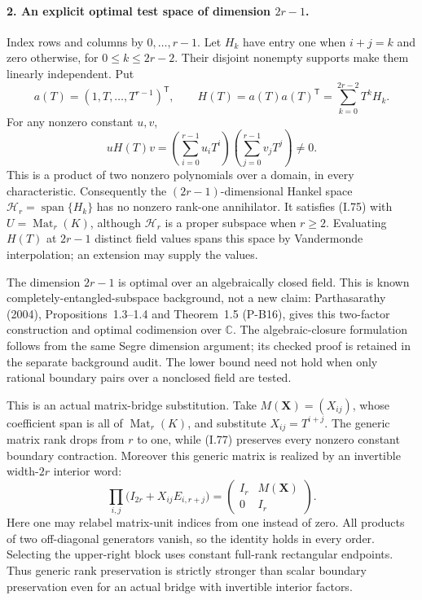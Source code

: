 \paragraph{2. An explicit optimal test space of dimension $2r-1$.}
Index rows and columns by $0,\ldots,r-1$. Let $H_k$ have entry one
when $i+j=k$ and zero otherwise, for $0\le k\le2r-2$. Their disjoint
nonempty supports make them linearly independent. Put
\[
 a(T)=(1,T,\ldots,T^{r-1})^{\mathsf T},\qquad
 H(T)=a(T)a(T)^{\mathsf T}=\sum_{k=0}^{2r-2}T^kH_k.
 \tag{I.76}
\]
For any nonzero constant $u,v$,
\[
 uH(T)v=
   \left(\sum_{i=0}^{r-1}u_iT^i\right)
   \left(\sum_{j=0}^{r-1}v_jT^j\right)\ne0.
 \tag{I.77}
\]
This is a product of two nonzero polynomials over a domain, in every
characteristic. Consequently the $(2r-1)$-dimensional Hankel space
$\mathcal H_r=\operatorname{span}\{H_k\}$ has no nonzero rank-one
annihilator. It satisfies (I.75) with $U=\operatorname{Mat}_r(K)$,
although $\mathcal H_r$ is a proper subspace when $r\ge2$.
Evaluating $H(T)$ at $2r-1$ distinct field values spans this space by
Vandermonde interpolation; an extension may supply the values.

The dimension $2r-1$ is optimal over an algebraically closed field.
This is known completely-entangled-subspace background, not a new
claim: Parthasarathy (2004), Propositions~1.3--1.4 and Theorem~1.5
(P-B16), gives this two-factor construction and optimal codimension
over $\mathbb C$. The algebraic-closure formulation follows from
the same Segre dimension argument; its checked proof is retained
in the separate background audit. The lower bound need not hold
when only rational boundary pairs over a nonclosed field are tested.

This is an actual matrix-bridge substitution. Take
$M(\mathbf X)=(X_{ij})$, whose coefficient span is all of
$\operatorname{Mat}_r(K)$, and substitute $X_{ij}=T^{i+j}$.
The generic matrix rank drops from $r$ to one, while (I.77) preserves
every nonzero constant boundary contraction. Moreover this generic
matrix is realized by an invertible width-$2r$ interior word:
\[
 \prod_{i,j}\bigl(I_{2r}+X_{ij}E_{i,r+j}\bigr)
     =\begin{pmatrix}I_r&M(\mathbf X)\\0&I_r\end{pmatrix}.
 \tag{I.78}
\]
Here one may relabel matrix-unit indices from one instead of zero.
All products of two off-diagonal generators vanish, so the identity
holds in every order. Selecting the upper-right block uses constant
full-rank rectangular endpoints. Thus generic rank preservation is
strictly stronger than scalar boundary preservation even for an
actual bridge with invertible interior factors.

